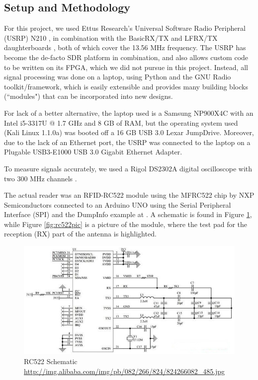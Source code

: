 \documentclass[fleqn,10pt]{SelfArx} %
\begin{document}
\subsection{Setup and Methodology}

For this project, we used Ettus Research's Universal Software Radio Peripheral (USRP) N210 \cite{usrp}, in combination with the BasicRX/TX and LFRX/TX daughterboards \cite{daughterboards}, both of which cover the 13.56 MHz frequency. The USRP has become the de-facto SDR platform in combination, and also allows custom code to be written on its FPGA, which we did not pursue in this project. Instead, all signal processing was done on a laptop, using Python and the GNU Radio toolkit/framework, which is easily extensible and provides many building blocks (``modules") that can be incorporated into new designs.

For lack of a better alternative, the laptop used is a Samsung NP900X4C with an Intel i5-3317U @ 1.7 GHz and 8 GB of RAM, but the operating system used (Kali Linux 1.1.0a) was booted off a 16 GB USB 3.0 Lexar JumpDrive. Moreover, due to the lack of an Ethernet port, the USRP was connected to the laptop on a Plugable USB3-E1000 USB 3.0 Gigabit Ethernet Adapter.


To measure signals accurately, we used a Rigol DS2302A digital oscilloscope with two 300 MHz channels \cite{rigol}. 

The actual reader was an RFID-RC522 module using the MFRC522 chip by NXP Semiconductors \cite{mfrc522} connected to an Arduino UNO using the Serial Peripheral Interface (SPI) and the DumpInfo example at \cite{library}. A schematic is found in Figure \ref{fig:rc522schematic}, while Figure \ref{fig:rc522pic} is a picture of the module, where the test pad for the reception (RX) part of the antenna is highlighted.


\begin{figure}[h]
  \includegraphics[width=\linewidth]{img/rc522schematic}
  \caption{RC522 Schematic \url{http://img.alibaba.com/img/pb/082/266/824/824266082_485.jpg}}
  \label{fig:rc522schematic}
\end{figure}
\end{document}
